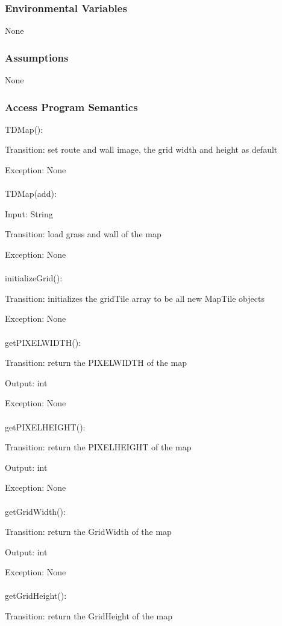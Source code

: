\documentclass[12,english]{article}
\begin{document}
		\subsubsection{Environmental Variables}
		None
		\subsubsection{Assumptions}
        None

		\subsubsection{Access Program Semantics}
		TDMap():
		
		Transition: set route and wall image, the grid width and height as default
		
		Exception: None\\
		\\
		TDMap(add):
		
		Input: String
		
		Transition: load grass and wall of the map
		
		Exception: None\\
		\\
		initializeGrid():

		Transition: initializes the gridTile array to be all new MapTile objects
		
		Exception: None\\
		\\
		getPIXELWIDTH():

		Transition: return the PIXELWIDTH of the map
		
		Output: int
		
		Exception: None\\
		\\
		getPIXELHEIGHT():

		Transition: return the PIXELHEIGHT of the map
		
		Output: int
		
		Exception: None\\
		\\
		getGridWidth():

		Transition: return the GridWidth of the map
		
		Output: int
		
		Exception: None\\
		\\
		getGridHeight():

		Transition: return the GridHeight of the map
		
\end{document}
